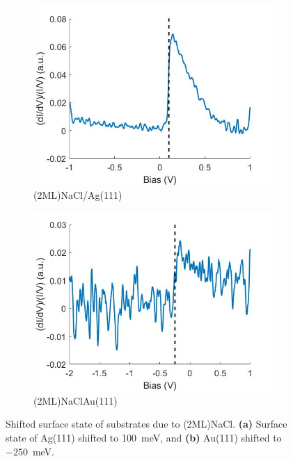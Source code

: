 \begin{figure} [H]
    \centering
    \begin{subfigure}[t]{0.49\textwidth}
    \includegraphics[width=\textwidth]{pictures/2mlnacl_ag111_surface_state.jpg}
    \caption{(2ML)NaCl/Ag(111)}
    \end{subfigure}
    \hfill
    \begin{subfigure}[t]{0.49\textwidth}
    \includegraphics[width=\textwidth]{pictures/2mlnacl_au111_surface_state.jpg}
    \caption{(2ML)NaClAu(111)}
    \end{subfigure}
    
    \caption{Shifted surface state of substrates due to (2ML)NaCl. \textbf{(a)} Surface state of Ag(111) shifted to \SI{+100}{meV}, and \textbf{(b)} Au(111) shifted to \SI{-250}{meV}.}
    \label{fig:expsetup:NaClstate}
\end{figure}

